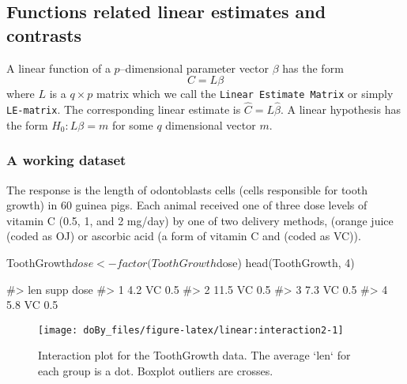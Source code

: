 \hypertarget{functions-related-linear-estimates-and-contrasts}{%
\subsection{Functions related linear estimates and
contrasts}\label{functions-related-linear-estimates-and-contrasts}}

A linear function of a \(p\)--dimensional parameter vector \(\beta\) has
the form \begin{displaymath}
  C=L\beta
\end{displaymath} where \(L\) is a \(q\times p\) matrix which we call
the \texttt{Linear\ Estimate\ Matrix} or simply \texttt{LE-matrix}. The
corresponding linear estimate is \(\hat C = L \hat \beta\). A linear
hypothesis has the form \(H_0: L\beta=m\) for some \(q\) dimensional
vector \(m\).

\hypertarget{a-working-dataset-1}{%
\subsubsection{A working dataset}\label{a-working-dataset-1}}

The response is the length of odontoblasts cells (cells responsible for
tooth growth) in 60 guinea pigs. Each animal received one of three dose
levels of vitamin C (0.5, 1, and 2 mg/day) by one of two delivery
methods, (orange juice (coded as OJ) or ascorbic acid (a form of vitamin
C and (coded as VC)).

\begin{Schunk}
\begin{Sinput}
ToothGrowth$dose <- factor(ToothGrowth$dose)
head(ToothGrowth, 4)
\end{Sinput}
\begin{Soutput}
#>    len supp dose
#> 1  4.2   VC  0.5
#> 2 11.5   VC  0.5
#> 3  7.3   VC  0.5
#> 4  5.8   VC  0.5
\end{Soutput}
\end{Schunk}

\begin{Schunk}
\begin{figure}
\texttt{[image: doBy\_files/figure-latex/linear:interaction2-1]} \caption[Interaction plot for the ToothGrowth data]{Interaction plot for the ToothGrowth data. The average `len` for each group is a dot. Boxplot outliers are crosses.}\label{fig:linear:interaction2}
\end{figure}
\end{Schunk}

